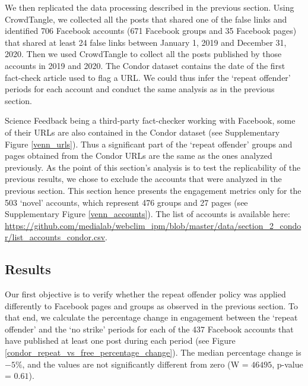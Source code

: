 \documentclass[review]{elsarticle}
\begin{document}
We then replicated the data processing described in the previous section.
Using CrowdTangle, we collected all the posts that shared one of the false links and identified 706 Facebook accounts (671 Facebook groups and 35 Facebook pages) that shared at least 24 false links between January 1, 2019 and December 31, 2020.
Then we used CrowdTangle to collect all the posts published by those accounts in 2019 and 2020.
The Condor dataset contains the date of the first fact-check article used to flag a URL. We could thus infer the `repeat offender' periods for each account and conduct the same analysis as in the previous section.

Science Feedback being a third-party fact-checker working with Facebook, some of their URLs are also contained in the Condor dataset (see Supplementary Figure \ref{venn_urls}).
Thus a significant part of the `repeat offender' groups and pages obtained from the Condor URLs are the same as the ones analyzed previously. 
As the point of this section’s analysis is to test the replicability of the previous results, we chose to exclude the accounts that were analyzed in the previous section. 
This section hence presents the engagement metrics only for the 503 `novel' accounts, which represent 476 groups and 27 pages (see Supplementary Figure \ref{venn_accounts}).
The list of accounts is available here: \url{https://github.com/medialab/webclim_ipm/blob/master/data/section_2_condor/list_accounts_condor.csv}.
 
\subsection{Results}

Our first objective is to verify whether the repeat offender policy was applied differently to Facebook pages and groups as observed in the previous section.
To that end, we calculate the percentage change in engagement between the `repeat offender' and the `no strike' periods for each of the 437 Facebook accounts that have published at least one post during each period (see Figure \ref{condor_repeat_vs_free_percentage_change}). 
The median percentage change is $-5\%$, and the values are not significantly different from zero (W = $46495$, p-value = $0.61$).
\end{document}
